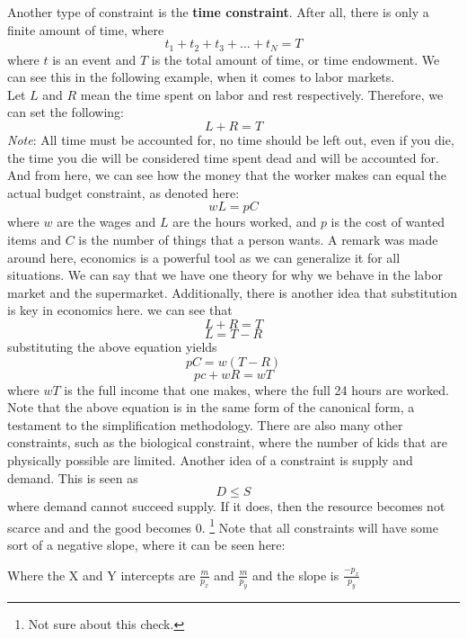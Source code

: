 \documentclass{article}
\begin{document}
Another type of constraint is the \textbf{time constraint}. After all, there is only a finite amount of time, where 
\[
t_1 + t_2 + t_3 +  \dots + t_N = T
\]
where $t$ is an event and $T$ is the total amount of time, or time endowment. We can see this in the following example, when it comes to labor markets. \\


Let $L$ and $R$ mean the time spent on labor and rest respectively. Therefore, we can set the following:
\[
L + R = T
\]
\textit{Note}: All time must be accounted for, no time should be left out, even if you die, the time you die will be considered time spent dead and will be accounted for. And from here, we can see how the money that the worker makes can equal the actual budget constraint, as denoted here:
\[
wL = pC
\]
where $w$ are the wages and $L$ are the hours worked, and $p$ is the cost of wanted items and $C$ is the number of things that a person wants. A remark was made around here, economics is a powerful tool as we can generalize it for all situations. We can say that we have one theory for why we behave  in the labor market and the supermarket. Additionally, there is another idea that substitution is key in economics here. we can see that 
\[
L + R = T 
\]
\[
L = T - R
\]
substituting the above equation yields 
\[
pC = w(T - R)
\]
\[
pc + wR = wT
\]
where $wT$ is the full income that one makes, where the full 24 hours are worked. Note that the above equation is in the same form of the canonical form, a testament to the simplification methodology. There are also many other constraints, such as the biological constraint, where the number of kids that are physically possible are limited. Another idea of a constraint is supply and demand. This is seen as 
\[
D \leq S
\]
where demand cannot succeed supply. If it does, then the resource becomes not scarce and and the good becomes 0. \footnote{Not sure about this check.} Note that all constraints will have some sort of a negative slope, where it can be seen here:
\begin{center}
\end{center}
Where the X and Y intercepts are $\frac{m}{p_x}$ and $\frac{m}{p_y}$ and the slope is $\frac{-p_x}{p_y}$
\end{document}
